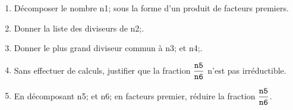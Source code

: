\documentclass[exercice]{thedocument}%
\begin{document}
%
\begin{enumerate}
    \item Décomposer le nombre \<n1; sous la forme d'un produit de facteurs
    premiers.
    \item Donner la liste des diviseurs de \<n2;.
    \item Donner le plus grand diviseur commun à \<n3; et \<n4;.
    \item Sans effectuer de calculs, justifier que la fraction $\dfrac{\<n5;}{\<n6;}$ n'est pas irréductible.
    \item En décomposant \<n5; et \<n6; en facteurs premier, réduire la fraction $\dfrac{\<n5;}{\<n6;}$.
\end{enumerate} 
\end{document}

